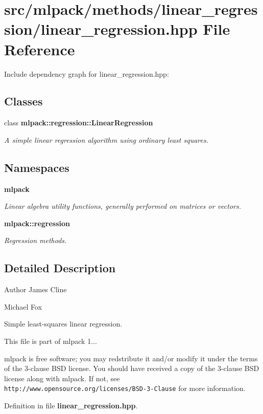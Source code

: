 \section{src/mlpack/methods/linear\-\_\-regression/linear\-\_\-regression.hpp File Reference}
\label{linear__regression_8hpp}
Include dependency graph for linear\-\_\-regression.\-hpp\-:
\subsection*{Classes}
\begin{DoxyCompactItemize}
\item 
class {\bf mlpack\-::regression\-::\-Linear\-Regression}
\begin{DoxyCompactList}\small\item\em A simple linear regression algorithm using ordinary least squares. \end{DoxyCompactList}\end{DoxyCompactItemize}
\subsection*{Namespaces}
\begin{DoxyCompactItemize}
\item 
{\bf mlpack}
\begin{DoxyCompactList}\small\item\em Linear algebra utility functions, generally performed on matrices or vectors. \end{DoxyCompactList}\item 
{\bf mlpack\-::regression}
\begin{DoxyCompactList}\small\item\em Regression methods. \end{DoxyCompactList}\end{DoxyCompactItemize}


\subsection{Detailed Description}
\begin{DoxyAuthor}{Author}
James Cline 

Michael Fox
\end{DoxyAuthor}
Simple least-\/squares linear regression.

This file is part of mlpack 1...

mlpack is free software; you may redstribute it and/or modify it under the terms of the 3-\/clause B\-S\-D license. You should have received a copy of the 3-\/clause B\-S\-D license along with mlpack. If not, see {\tt http\-://www.\-opensource.\-org/licenses/\-B\-S\-D-\/3-\/\-Clause} for more information. 

Definition in file {\bf linear\-\_\-regression.\-hpp}.

